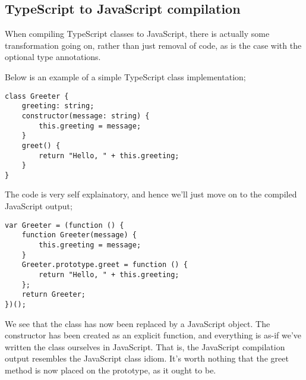 \subsection*{TypeScript to JavaScript compilation}
When compiling TypeScript classes to JavaScript, there is actually some transformation going on, rather than just removal of code, as is the case with the optional type annotations.

Below is an example of a simple TypeScript class implementation;
\begin{verbatim}
class Greeter {
    greeting: string;
    constructor(message: string) {
        this.greeting = message;
    }
    greet() {
        return "Hello, " + this.greeting;
    }
}
\end{verbatim}
The code is very self explainatory, and hence we'll just move on to the compiled JavaScript output;
\begin{verbatim}
var Greeter = (function () {
    function Greeter(message) {
        this.greeting = message;
    }
    Greeter.prototype.greet = function () {
        return "Hello, " + this.greeting;
    };
    return Greeter;
})();
\end{verbatim}
We see that the class has now been replaced by a JavaScript object.
The constructor has been created as an explicit function, and everything is as-if we've written the class ourselves in JavaScript.
That is, the JavaScript compilation output resembles the JavaScript class idiom.
It's worth nothing that the greet method is now placed on the prototype, as it ought to be.


